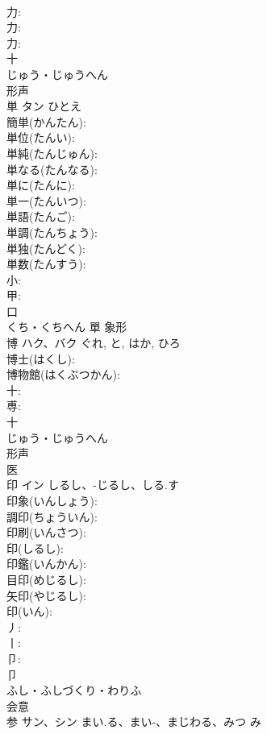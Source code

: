 \documentclass[8pt]{extreport}
\begin{document}
\begin{CJK}{UTF8}{min}
\\	力: 
\\	力: 
\\	力: 
\\	十	
\\	じゅう・じゅうへん	
\\	形声 
\\	単	タン	ひとえ		
\\	簡単(かんたん): 
\\	単位(たんい): 
\\	単純(たんじゅん): 
\\	単なる(たんなる): 
\\	単に(たんに): 
\\	単一(たんいつ): 
\\	単語(たんご): 
\\	単調(たんちょう): 
\\	単独(たんどく): 
\\	単数(たんすう): 
\\	小: 
\\	甲: 
\\	口	
\\	くち・くちへん	單	象形 
\\	博	ハク、バク		ぐれ, と, はか, ひろ	
\\	博士(はくし): 
\\	博物館(はくぶつかん): 
\\	十: 
\\	尃: 
\\	十	
\\	じゅう・じゅうへん	
\\	形声 
\\	医 
\\	印	イン	しるし、-じるし、しる.す		
\\	印象(いんしょう): 
\\	調印(ちょういん): 
\\	印刷(いんさつ): 
\\	印(しるし): 
\\	印鑑(いんかん): 
\\	目印(めじるし): 
\\	矢印(やじるし): 
\\	印(いん): 
\\	丿: 
\\	丨: 
\\	卩: 
\\	卩	
\\	ふし・ふしづくり・わりふ	
\\	会意 
\\	参	サン、シン	まい.る、まい-、まじわる、みつ	み	

\end{CJK}
\end{document}
